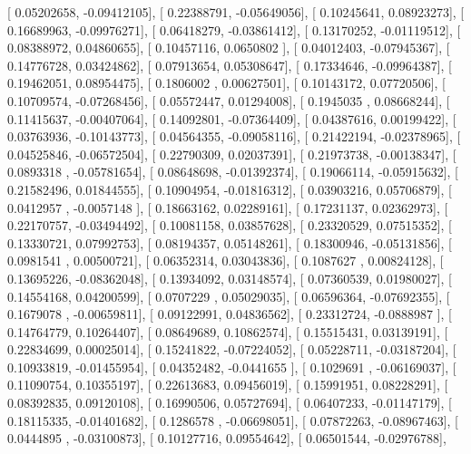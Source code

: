 \documentclass{article}
\begin{document}
       [ 0.05202658, -0.09412105],
       [ 0.22388791, -0.05649056],
       [ 0.10245641,  0.08923273],
       [ 0.16689963, -0.09976271],
       [ 0.06418279, -0.03861412],
       [ 0.13170252, -0.01119512],
       [ 0.08388972,  0.04860655],
       [ 0.10457116,  0.0650802 ],
       [ 0.04012403, -0.07945367],
       [ 0.14776728,  0.03424862],
       [ 0.07913654,  0.05308647],
       [ 0.17334646, -0.09964387],
       [ 0.19462051,  0.08954475],
       [ 0.1806002 ,  0.00627501],
       [ 0.10143172,  0.07720506],
       [ 0.10709574, -0.07268456],
       [ 0.05572447,  0.01294008],
       [ 0.1945035 ,  0.08668244],
       [ 0.11415637, -0.00407064],
       [ 0.14092801, -0.07364409],
       [ 0.04387616,  0.00199422],
       [ 0.03763936, -0.10143773],
       [ 0.04564355, -0.09058116],
       [ 0.21422194, -0.02378965],
       [ 0.04525846, -0.06572504],
       [ 0.22790309,  0.02037391],
       [ 0.21973738, -0.00138347],
       [ 0.0893318 , -0.05781654],
       [ 0.08648698, -0.01392374],
       [ 0.19066114, -0.05915632],
       [ 0.21582496,  0.01844555],
       [ 0.10904954, -0.01816312],
       [ 0.03903216,  0.05706879],
       [ 0.0412957 , -0.0057148 ],
       [ 0.18663162,  0.02289161],
       [ 0.17231137,  0.02362973],
       [ 0.22170757, -0.03494492],
       [ 0.10081158,  0.03857628],
       [ 0.23320529,  0.07515352],
       [ 0.13330721,  0.07992753],
       [ 0.08194357,  0.05148261],
       [ 0.18300946, -0.05131856],
       [ 0.0981541 ,  0.00500721],
       [ 0.06352314,  0.03043836],
       [ 0.1087627 ,  0.00824128],
       [ 0.13695226, -0.08362048],
       [ 0.13934092,  0.03148574],
       [ 0.07360539,  0.01980027],
       [ 0.14554168,  0.04200599],
       [ 0.0707229 ,  0.05029035],
       [ 0.06596364, -0.07692355],
       [ 0.1679078 , -0.00659811],
       [ 0.09122991,  0.04836562],
       [ 0.23312724, -0.0888987 ],
       [ 0.14764779,  0.10264407],
       [ 0.08649689,  0.10862574],
       [ 0.15515431,  0.03139191],
       [ 0.22834699,  0.00025014],
       [ 0.15241822, -0.07224052],
       [ 0.05228711, -0.03187204],
       [ 0.10933819, -0.01455954],
       [ 0.04352482, -0.0441655 ],
       [ 0.1029691 , -0.06169037],
       [ 0.11090754,  0.10355197],
       [ 0.22613683,  0.09456019],
       [ 0.15991951,  0.08228291],
       [ 0.08392835,  0.09120108],
       [ 0.16990506,  0.05727694],
       [ 0.06407233, -0.01147179],
       [ 0.18115335, -0.01401682],
       [ 0.1286578 , -0.06698051],
       [ 0.07872263, -0.08967463],
       [ 0.0444895 , -0.03100873],
       [ 0.10127716,  0.09554642],
       [ 0.06501544, -0.02976788],
\end{document}
